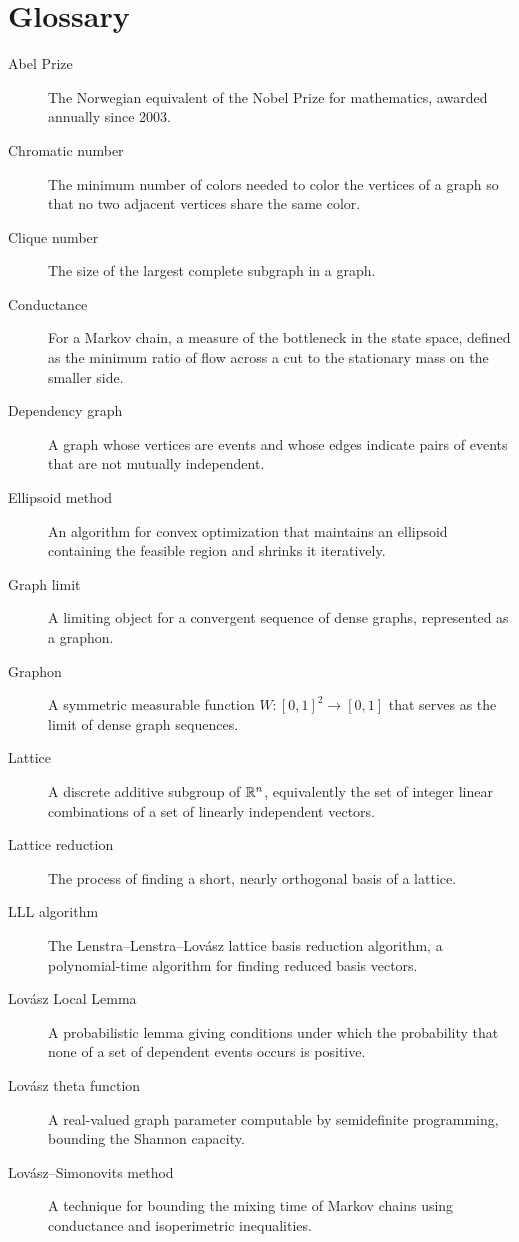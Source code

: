 \section*{Glossary}

\begin{description}
  \item[Abel Prize] The Norwegian equivalent of the Nobel Prize for mathematics, awarded annually since 2003.
  \item[Chromatic number] The minimum number of colors needed to color the vertices of a graph so that no two adjacent vertices share the same color.
  \item[Clique number] The size of the largest complete subgraph in a graph.
  \item[Conductance] For a Markov chain, a measure of the bottleneck in the state space, defined as the minimum ratio of flow across a cut to the stationary mass on the smaller side.
  \item[Dependency graph] A graph whose vertices are events and whose edges indicate pairs of events that are not mutually independent.
  \item[Ellipsoid method] An algorithm for convex optimization that maintains an ellipsoid containing the feasible region and shrinks it iteratively.
  \item[Graph limit] A limiting object for a convergent sequence of dense graphs, represented as a graphon.
  \item[Graphon] A symmetric measurable function \(W: [0,1]^2 \to [0,1]\) that serves as the limit of dense graph sequences.
  \item[Lattice] A discrete additive subgroup of \(\mathbb{R}^n\), equivalently the set of integer linear combinations of a set of linearly independent vectors.
  \item[Lattice reduction] The process of finding a short, nearly orthogonal basis of a lattice.
  \item[LLL algorithm] The Lenstra--Lenstra--Lov\'{a}sz lattice basis reduction algorithm, a polynomial-time algorithm for finding reduced basis vectors.
  \item[Lov\'{a}sz Local Lemma] A probabilistic lemma giving conditions under which the probability that none of a set of dependent events occurs is positive.
  \item[Lov\'{a}sz theta function] A real-valued graph parameter computable by semidefinite programming, bounding the Shannon capacity.
  \item[Lov\'{a}sz--Simonovits method] A technique for bounding the mixing time of Markov chains using conductance and isoperimetric inequalities.

\end{description}
